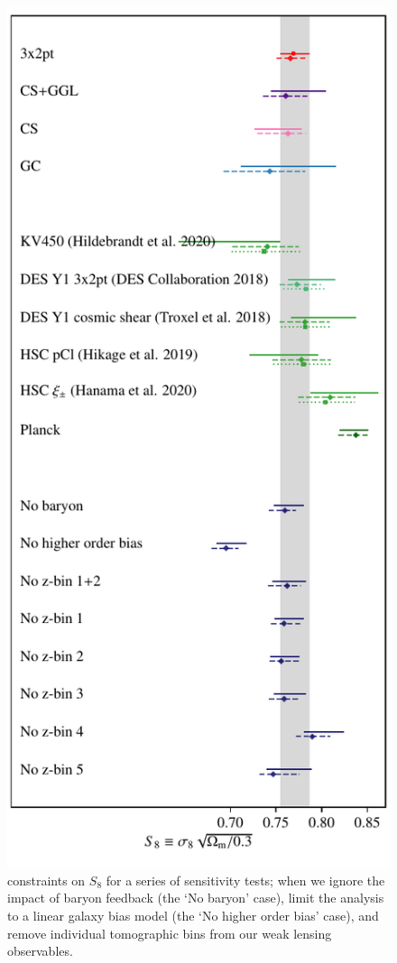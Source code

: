 \begin{figure}
	\begin{center}
		\includegraphics[width=\columnwidth]{Parameter_Plots/systematics/S8_comparison_blindC}
		\caption{\tttp constraints on $S_8$ for a series of sensitivity tests; when we ignore the impact of baryon feedback (the `No baryon' case), limit the analysis to a linear galaxy bias model (the `No higher order bias' case), and remove individual tomographic bins from our weak lensing observables.    
		\label{fig:S8comp_sensitivity}}
	\end{center}
\end{figure}

